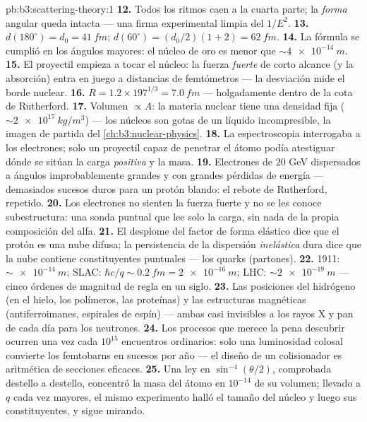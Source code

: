 \begin{solution}{pb:b3:scattering-theory:1}
\textbf{12.} Todos los ritmos caen a la cuarta parte; la \emph{forma}
angular queda intacta --- una firma experimental limpia del $1/E^2$.
\textbf{13.} $d(180^\circ) = d_0 = \qty{41}{fm}$; $d(60^\circ) =
(d_0/2)(1 + 2) = \qty{62}{fm}$.
\textbf{14.} La fórmula se cumplió en los ángulos mayores: el núcleo de
oro es menor que $\sim\qty{4e-14}{m}$.
\textbf{15.} El proyectil empieza a tocar el núcleo: la fuerza
\emph{fuerte} de corto alcance (y la absorción) entra en juego a
distancias de femtómetros --- la desviación mide el borde
nuclear.
\textbf{16.} $R = 1.2 \times 197^{1/3} = \qty{7.0}{fm}$ ---
holgadamente dentro de la cota de Rutherford.
\textbf{17.} Volumen $\propto A$: la materia nuclear tiene una densidad
fija ($\sim\qty{2e17}{kg/m^3}$) --- los núcleos son gotas de un líquido
incompresible, la imagen de partida del
\cref{ch:b3:nuclear-physics}.
\textbf{18.} La espectroscopia interrogaba a los electrones; solo un
proyectil capaz de penetrar el átomo podía atestiguar dónde se sitúan la
carga \emph{positiva} y la masa.
\textbf{19.} Electrones de $20$ GeV dispersados a ángulos
improbablemente grandes y con grandes pérdidas de energía --- demasiados
sucesos duros para un protón blando: el rebote de Rutherford, repetido.
\textbf{20.} Los electrones no sienten la fuerza fuerte y no se les conoce
subestructura: una sonda puntual que lee solo la carga, sin nada de la
propia composición del alfa.
\textbf{21.} El desplome del factor de forma elástico dice que el protón
es una nube difusa; la persistencia de la dispersión \emph{inelástica} dura
dice que la nube contiene constituyentes puntuales ---
los quarks (partones).
\textbf{22.} 1911: $\sim\qty{e-14}{m}$; SLAC: $\hbar c/q \sim
\qty{0.2}{fm} = \qty{2e-16}{m}$; LHC: $\sim\qty{2e-19}{m}$ ---
cinco órdenes de magnitud de regla en un siglo.
\textbf{23.} Las posiciones del hidrógeno (en el hielo, los polímeros, las
proteínas) y las estructuras magnéticas (antiferroimanes, espirales de
espín) --- ambas casi invisibles a los rayos X y pan de cada día para los
neutrones.
\textbf{24.} Los procesos que merece la pena descubrir ocurren una vez cada
$10^{15}$ encuentros ordinarios: solo una luminosidad colosal convierte los
femtobarns en sucesos por año --- el diseño de un colisionador es
aritmética de secciones eficaces.
\textbf{25.} Una ley en $\sin^{-4}(\theta/2)$, comprobada destello a
destello, concentró la masa del átomo en $10^{-14}$ de su volumen; llevado
a $q$ cada vez mayores, el mismo experimento halló el tamaño del núcleo y
luego sus constituyentes, y sigue mirando.
\end{solution}
